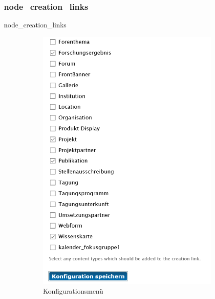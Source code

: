 \subsubsection{node\_creation\_links}\label{subsub:nodecreationlinks}
node\_creation\_links
\begin{figure}[H]
	\centering
	\begin{subfigure}[a]{0.4\textwidth}
		\centering
		\includegraphics[height=0.20\textheight]{images/config_nodecreationlinks}
		\caption[]{Konfigurationsmenü}
		\label{fig:config_nodecreationlinks}
	\end{subfigure}
	\begin{subfigure}[A]{0.4\textwidth}
		\centering

\end{subfigure}
\end{figure}
